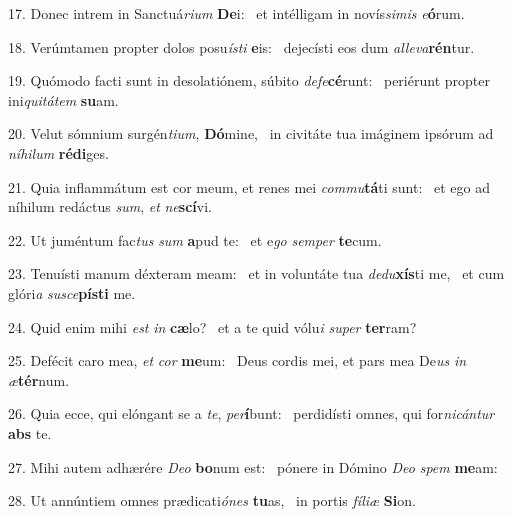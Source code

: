 17. Donec intrem in Sanctuá\textit{ri}\textit{um} \textbf{De}i: \ast\  et intélligam in novís\textit{si}\textit{mis} \textit{e}\textbf{ó}rum.\

18. Verúmtamen propter dolos posu\textit{ís}\textit{ti} \textbf{e}is: \ast\  dejecísti eos dum \textit{al}\textit{le}\textit{va}\textbf{rén}tur.\

19. Quómodo facti sunt in desolatiónem, súbito \textit{de}\textit{fe}\textbf{cé}runt: \ast\  periérunt propter ini\textit{qui}\textit{tá}\textit{tem} \textbf{su}am.\

20. Velut sómnium surgén\textit{ti}\textit{um}, \textbf{Dó}mine, \ast\  in civitáte tua imáginem ipsórum ad \textit{ní}\textit{hi}\textit{lum} \textbf{réd}\textbf{i}ges.\

21. Quia inflammátum est cor meum, et renes mei \textit{com}\textit{mu}\textbf{tá}ti sunt: \ast\  et ego ad níhilum redáctus \textit{sum}, \textit{et} \textit{ne}\textbf{scí}vi.\

22. Ut juméntum fac\textit{tus} \textit{sum} \textbf{a}pud te: \ast\  et e\textit{go} \textit{sem}\textit{per} \textbf{te}cum.\

23. Tenuísti manum déxteram meam: \dag\  et in voluntáte tua \textit{de}\textit{du}\textbf{xís}ti me, \ast\  et cum glóri\textit{a} \textit{su}\textit{sce}\textbf{pís}\textbf{ti} me.\

24. Quid enim mihi \textit{est} \textit{in} \textbf{cæ}lo? \ast\  et a te quid vólu\textit{i} \textit{su}\textit{per} \textbf{ter}ram?\

25. Defécit caro mea, \textit{et} \textit{cor} \textbf{me}um: \ast\  Deus cordis mei, et pars mea De\textit{us} \textit{in} \textit{æ}\textbf{tér}num.\

26. Quia ecce, qui elóngant se a \textit{te}, \textit{per}\textbf{í}bunt: \ast\  perdidísti omnes, qui for\textit{ni}\textit{cán}\textit{tur} \textbf{abs} te.\

27. Mihi autem adhærére \textit{De}\textit{o} \textbf{bo}num est: \ast\  pónere in Dómino \textit{De}\textit{o} \textit{spem} \textbf{me}am:\

28. Ut annúntiem omnes prædicati\textit{ó}\textit{nes} \textbf{tu}as, \ast\  in portis \textit{fí}\textit{li}\textit{æ} \textbf{Si}on.\

